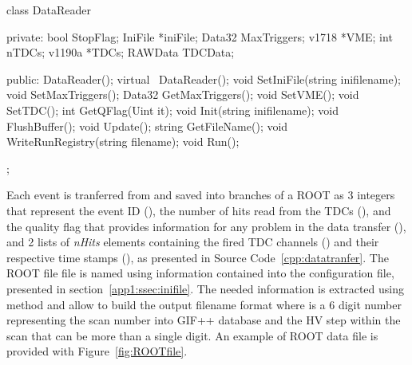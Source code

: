 	\begin{code}
    \begin{cppcode}
class DataReader
{
    private:
        bool     StopFlag;
        IniFile *iniFile;
        Data32   MaxTriggers;
        v1718   *VME;
        int      nTDCs;
        v1190a  *TDCs;
        RAWData  TDCData;

    public:
        DataReader();
        virtual ~DataReader();
        void     SetIniFile(string inifilename);
        void     SetMaxTriggers();
        Data32   GetMaxTriggers();
        void     SetVME();
        void     SetTDC();
        int      GetQFlag(Uint it);
        void     Init(string inifilename);
        void     FlushBuffer();
        void     Update();
        string   GetFileName();
        void     WriteRunRegistry(string filename);
        void     Run();
};
    \end{cppcode}
	\label{cpp:datareader}
	\vspace{5mm}
    \end{code}

    Each event is tranferred from  and saved into branches of a ROOT  as 3 integers that represent the event ID (), the number of hits read from the TDCs (), and the quality flag that provides information for any problem in the data transfer (), and 2 lists of \textit{nHits} elements containing the fired TDC channels () and their respective time stamps (), as presented in Source Code~\ref{cpp:datatranfer}. The ROOT file file is named using information contained into the configuration file, presented in section~\ref{app1:ssec:inifile}. The needed information is extracted using method  and allow to build the output filename format  where  is a 6 digit number representing the scan number into GIF++ database and  the HV step within the scan that can be more than a single digit. An example of ROOT data file is provided with Figure~\ref{fig:ROOTfile}.\\
    
